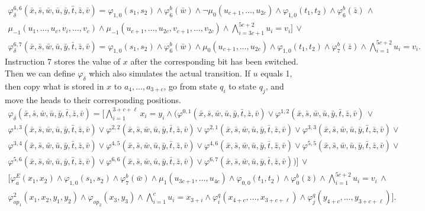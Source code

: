 \begin{multline*}
\varphi^{6,6}_{\delta}(\bar{x},\bar{s},\bar{w},\bar{u},\bar{y},\bar{t},\bar{z},\bar{v}) = \varphi_{1,0}(s_1,s_2) \wedge \varphi^b_6(\bar{w}) \wedge \neg \mu_0(u_{c+1},\ldots,u_{2c}) \wedge \varphi_{1,0}(t_1,t_2) \wedge \varphi^b_6(\bar{z}) \, \wedge \\
\mu_{-1}(u_1,\ldots,u_c,v_i,\ldots,v_c) \wedge \mu_{-1}(u_{c+1},\ldots,u_{2c},v_{c+1},\ldots,v_{2c}) \wedge \bigwedge_{i = 3c+1}^{5c+2} u_i = v_i]\,\vee \\
\varphi^{6,7}_{\delta}(\bar{x},\bar{s},\bar{w},\bar{u},\bar{y},\bar{t},\bar{z},\bar{v}) = \varphi_{1,0}(s_1,s_2) \wedge \varphi^b_6(\bar{w}) \wedge \mu_0(u_{c+1},\ldots,u_{2c}) \wedge \varphi_{1,0}(t_1,t_2) \wedge \varphi^b_7(\bar{z}) \wedge \bigwedge_{i = 1}^{5c+2} u_i = v_i.
\end{multline*}
Instruction 7 stores the value of $x$ after the corresponding bit has been switched. Then we can define $\varphi_{\delta}$ which also simulates the actual transition. If $u$ equals 1, then copy what is stored in $x$ to $a_4,\ldots,a_{3+c}$, go from state $q_i$ to state $q_j$, and move the heads to their corresponding positions.
\begin{multline*}
\varphi_{\delta}(\bar{x},\bar{s},\bar{w},\bar{u},\bar{y},\bar{t},\bar{z},\bar{v}) = 	[\bigwedge_{i = 1}^{3+c+\ell} x_i = y_i \wedge (\varphi^{0,1}(\bar{x},\bar{s},\bar{w},\bar{u},\bar{y},\bar{t},\bar{z},\bar{v}) \vee \varphi^{1,2}(\bar{x},\bar{s},\bar{w},\bar{u},\bar{y},\bar{t},\bar{z},\bar{v})\, \vee \\ \varphi^{1,3}(\bar{x},\bar{s},\bar{w},\bar{u},\bar{y},\bar{t},\bar{z},\bar{v}) \vee \varphi^{2,2}(\bar{x},\bar{s},\bar{w},\bar{u},\bar{y},\bar{t},\bar{z},\bar{v}) \vee \varphi^{2,1}(\bar{x},\bar{s},\bar{w},\bar{u},\bar{y},\bar{t},\bar{z},\bar{v}) \vee \varphi^{3,3}(\bar{x},\bar{s},\bar{w},\bar{u},\bar{y},\bar{t},\bar{z},\bar{v}) \vee \\ \varphi^{3,4}(\bar{x},\bar{s},\bar{w},\bar{u},\bar{y},\bar{t},\bar{z},\bar{v}) \vee \varphi^{4,5}(\bar{x},\bar{s},\bar{w},\bar{u},\bar{y},\bar{t},\bar{z},\bar{v}) \vee \varphi^{4,6}(\bar{x},\bar{s},\bar{w},\bar{u},\bar{y},\bar{t},\bar{z},\bar{v}) \vee \varphi^{5,5}(\bar{x},\bar{s},\bar{w},\bar{u},\bar{y},\bar{t},\bar{z},\bar{v}) \vee \\ \varphi^{5,6}(\bar{x},\bar{s},\bar{w},\bar{u},\bar{y},\bar{t},\bar{z},\bar{v}) \vee \varphi^{6,6}(\bar{x},\bar{s},\bar{w},\bar{u},\bar{y},\bar{t},\bar{z},\bar{v}) \vee \varphi^{6,7}(\bar{x},\bar{s},\bar{w},\bar{u},\bar{y},\bar{t},\bar{z},\bar{v}))] \, \vee \\
[\varphi^E_a(x_1,x_2) \wedge \varphi_{1,0}(s_1,s_2) \wedge \varphi^b_7(\bar{w}) \wedge \mu_1(u_{3c+1},\ldots,u_{4c}) \wedge \varphi_{0,0}(t_1,t_2) \wedge \varphi^b_0(\bar{z}) \wedge \bigwedge_{i = 1}^{5c+2} u_i = v_i \,\wedge \\
\varphi^2_{op_1}(x_1,x_2,y_1,y_2) \wedge \varphi_{op_2}(x_3,y_3) \wedge \bigwedge_{i = 1}^c u_i = x_{3+i} \wedge \varphi^q_i(x_{4+c},\ldots,x_{3+c+\ell}) \wedge \varphi^q_j(y_{4+c},\ldots,y_{3+c+\ell})].
\end{multline*}


